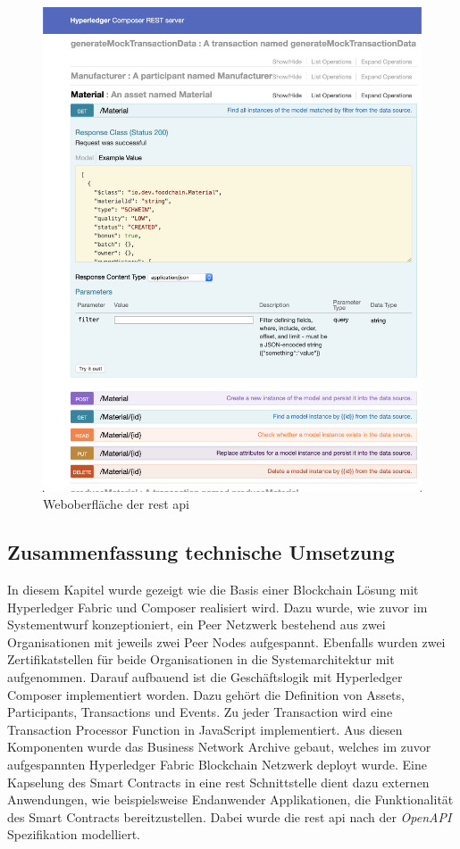\begin{figure}[H]
	\centering
	\includegraphics[width=1\linewidth]{pictures/rest-api-explorer}
	\caption[Weboberfläche der \acs{rest} \acs{api}]{Weboberfläche der \ac{rest} \ac{api}}
	\label{fig:rest-api-explorer}
\end{figure}


\subsection{Zusammenfassung technische Umsetzung}
In diesem Kapitel wurde gezeigt wie die Basis einer Blockchain Lösung mit Hyperledger Fabric und Composer realisiert wird. Dazu wurde, wie zuvor im Systementwurf konzeptioniert, ein Peer Netzwerk bestehend aus zwei Organisationen mit jeweils zwei Peer Nodes aufgespannt. Ebenfalls wurden zwei Zertifikatstellen für beide Organisationen in die Systemarchitektur mit aufgenommen. Darauf aufbauend ist die Geschäftslogik mit Hyperledger Composer implementiert worden. Dazu gehört die Definition von Assets, Participants, Transactions und Events. Zu jeder Transaction wird eine Transaction Processor Function in JavaScript implementiert. Aus diesen Komponenten wurde das Business Network Archive gebaut, welches im zuvor aufgespannten Hyperledger Fabric Blockchain Netzwerk deployt wurde. Eine Kapselung des Smart Contracts in eine \ac{rest} Schnittstelle dient dazu externen Anwendungen, wie beispielsweise Endanwender Applikationen, die Funktionalität des Smart Contracts bereitzustellen. Dabei wurde die \ac{rest} \ac{api} nach der \textit{OpenAPI} Spezifikation modelliert.


\newpage
